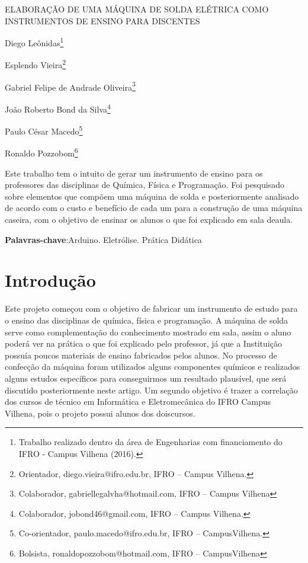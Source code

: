 \documentclass[article,12pt,onesidea,4paper,english,brazil]{abntex2}
\begin{document}
	
	
	\frenchspacing 
	
	\begin{center}
		\LARGE ELABORAÇÃO DE UMA MÁQUINA DE SOLDA ELÉTRICA COMO INSTRUMENTOS DE ENSINO PARA DISCENTES 
		
		\normalsize
	Diego Leônidas\footnote{Trabalho realizado dentro da área de Engenharias com financiamento do IFRO - Campus Vilhena (2016).} 
	
	Esplendo Vieira\footnote{ Orientador, diego.vieira@ifro.edu.br, IFRO – Campus Vilhena.} 
	
	Gabriel Felipe de Andrade Oliveira\footnote{Colaborador, gabriellegalvha@hotmail.com, IFRO – Campus Vilhena} 
	
		João Roberto Bond da Silva\footnote{ Colaborador, jobond46@gmail.com, IFRO – Campus Vilhena.}
		
		Paulo César Macedo\footnote{Co-orientador, paulo.macedo@ifro.edu.br, IFRO – CampusVilhena.}
		
		Ronaldo Pozzobom\footnote{Bolsista, ronaldopozzobom@hotmail.com, IFRO – CampusVilhena}
		 
	\end{center}
	
	\begin{resumoumacoluna}
		Este trabalho tem o intuito de gerar um instrumento de ensino para os professores das disciplinas de Química, Física e Programação. Foi pesquisado sobre elementos que compõem uma máquina de solda e posteriormente analisado de acordo com o custo e benefício de cada um para a construção de uma máquina caseira, com o objetivo de ensinar os alunos o que foi explicado em sala deaula.
		
		\vspace{\onelineskip}
		
		\noindent
		\textbf{Palavras-chave}:Arduino. Eletrólise. Prática Didática 
	\end{resumoumacoluna}
	
	\textual
	
	\section*{Introdução}
	
	Este projeto começou com o objetivo de fabricar um instrumento de estudo para o ensino das disciplinas de química, física e programação. A máquina de solda serve como complementação do conhecimento mostrado em sala, assim o aluno poderá ver na prática o que foi explicado pelo professor, já que a Instituição possuía poucos materiais de ensino fabricados pelos alunos. No processo de confecção da máquina foram utilizados alguns componentes químicos e realizados alguns estudos específicos para conseguirmos um resultado plausível, que será discutido posteriormente neste artigo. Um segundo objetivo é trazer a correlação dos cursos de técnico em Informática e Eletromecânica do IFRO Campus Vilhena, pois o projeto possui alunos dos doiscursos.
	
\end{document}
